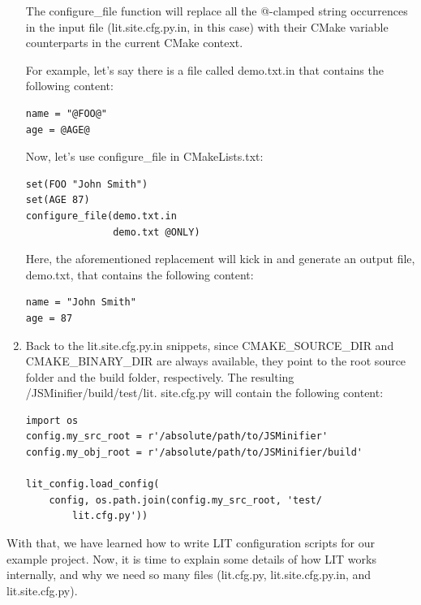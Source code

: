 \begin{enumerate}
The configure\_file function will replace all the @-clamped string occurrences in the input file (lit.site.cfg.py.in, in this case) with their CMake variable counterparts in the current CMake context.

For example, let's say there is a file called demo.txt.in that contains the following content:

\begin{lstlisting}[style=styleCMake]
name = "@FOO@"
age = @AGE@
\end{lstlisting}

Now, let's use configure\_file in CMakeLists.txt:

\begin{lstlisting}[style=styleCMake]
set(FOO "John Smith")
set(AGE 87)
configure_file(demo.txt.in
			   demo.txt @ONLY)
\end{lstlisting}

Here, the aforementioned replacement will kick in and generate an output file, demo.txt, that contains the following content:

\begin{lstlisting}[style=styleCMake]
name = "John Smith"
age = 87
\end{lstlisting}

\item Back to the lit.site.cfg.py.in snippets, since CMAKE\_SOURCE\_DIR and CMAKE\_BINARY\_DIR are always available, they point to the root source folder and the build folder, respectively. The resulting /JSMinifier/build/test/lit. site.cfg.py will contain the following content:

\begin{lstlisting}[style=stylePython]
import os
config.my_src_root = r'/absolute/path/to/JSMinifier'
config.my_obj_root = r'/absolute/path/to/JSMinifier/build'

lit_config.load_config(
	config, os.path.join(config.my_src_root, 'test/
		lit.cfg.py'))
\end{lstlisting}

\end{enumerate}

With that, we have learned how to write LIT configuration scripts for our example project. Now, it is time to explain some details of how LIT works internally, and why we need so many files (lit.cfg.py, lit.site.cfg.py.in, and lit.site.cfg.py).



